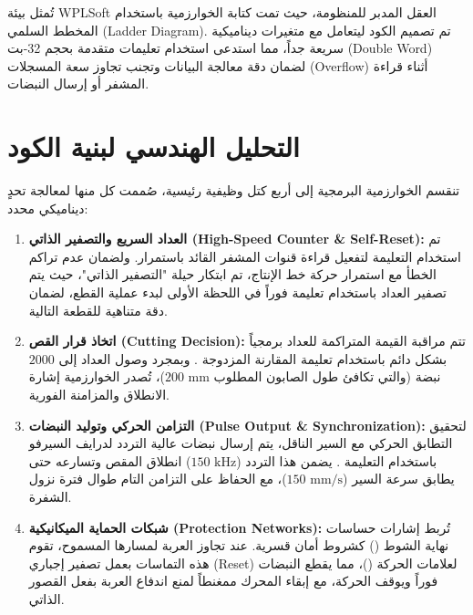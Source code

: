 \documentclass[12pt,a4paper,fleqn]{report}
\begin{document}
تُمثل بيئة \textenglish{WPLSoft} العقل المدبر للمنظومة، حيث تمت كتابة الخوارزمية باستخدام المخطط السلمي \textenglish{(Ladder Diagram)}. تم تصميم الكود ليتعامل مع متغيرات ديناميكية سريعة جداً، مما استدعى استخدام تعليمات متقدمة بحجم 32-بت \textenglish{(Double Word)} لضمان دقة معالجة البيانات وتجنب تجاوز سعة المسجلات \textenglish{(Overflow)} أثناء قراءة المشفر أو إرسال النبضات.

\section{التحليل الهندسي لبنية الكود}
تنقسم الخوارزمية البرمجية إلى أربع كتل وظيفية رئيسية، صُممت كل منها لمعالجة تحدٍ ديناميكي محدد:

\begin{enumerate}
    \item \textbf{العداد السريع والتصفير الذاتي (\textenglish{High-Speed Counter \& Self-Reset}):}
    تم استخدام التعليمة  لتفعيل قراءة قنوات المشفر القائد باستمرار. ولضمان عدم تراكم الخطأ مع استمرار حركة خط الإنتاج، تم ابتكار حيلة "التصفير الذاتي"، حيث يتم تصفير العداد  باستخدام تعليمة  فوراً في اللحظة الأولى لبدء عملية القطع، لضمان دقة متناهية للقطعة التالية.
    
    \item \textbf{اتخاذ قرار القص (\textenglish{Cutting Decision}):}
    تتم مراقبة القيمة المتراكمة للعداد برمجياً بشكل دائم باستخدام تعليمة المقارنة المزدوجة . وبمجرد وصول العداد إلى $2000$ نبضة (والتي تكافئ طول الصابون المطلوب $200\text{ mm}$)، تُصدر الخوارزمية إشارة الانطلاق والمزامنة الفورية.
    
    \item \textbf{التزامن الحركي وتوليد النبضات (\textenglish{Pulse Output \& Synchronization}):}
    لتحقيق التطابق الحركي مع السير الناقل، يتم إرسال نبضات عالية التردد لدرايف السيرفو باستخدام التعليمة . يضمن هذا التردد ($150\text{ kHz}$) انطلاق المقص وتسارعه حتى يطابق سرعة السير ($150\text{ mm/s}$)، مع الحفاظ على التزامن التام طوال فترة نزول الشفرة.
    
    \item \textbf{شبكات الحماية الميكانيكية (\textenglish{Protection Networks}):}
    تُربط إشارات حساسات نهاية الشوط () كشروط أمان قسرية. عند تجاوز العربة لمسارها المسموح، تقوم هذه التماسات بعمل تصفير إجباري (\textenglish{Reset}) لعلامات الحركة ()، مما يقطع النبضات فوراً ويوقف الحركة، مع إبقاء المحرك ممغنطاً لمنع اندفاع العربة بفعل القصور الذاتي.
\end{enumerate}
\end{document}
